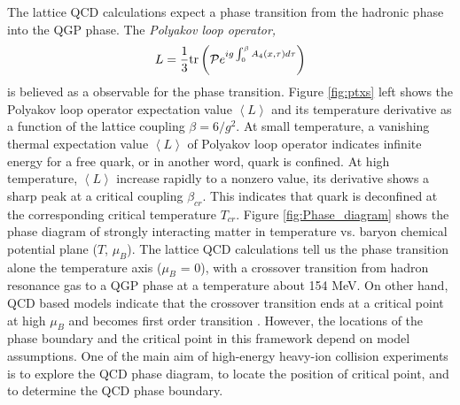 The lattice QCD calculations expect a phase transition from the hadronic
phase into the QGP phase. The\emph{ Polyakov loop operator,
\begin{equation}
L=\frac{1}{3}{\rm tr}\left(\mathcal{P}e^{ig\intop_{0}^{\beta}A_{4}(x,\tau)d\tau}\right)
\end{equation}
}is believed as a observable for the phase transition. Figure \ref{fig:ptxs}
left shows the Polyakov loop operator expectation value $\left\langle L\right\rangle $
and its temperature derivative as a function of the lattice coupling
$\beta=6/g^{2}$. At small temperature, a vanishing thermal expectation
value $\left\langle L\right\rangle $ of Polyakov loop operator indicates
infinite energy for a free quark, or in another word, quark is confined.
At high temperature, $\left\langle L\right\rangle $ increase rapidly
to a nonzero value, its derivative shows a sharp peak at a critical
coupling $\beta_{cr}$. This indicates that quark is deconfined at
the corresponding critical temperature $T_{cr}$. Figure \ref{fig:Phase_diagram}
shows the phase diagram of strongly interacting matter in temperature
vs. baryon chemical potential plane ($T$, $\mu_{B}$). The lattice
QCD calculations tell us the phase transition alone the temperature
axis ($\mu_{B}$ = 0), with a crossover transition from hadron resonance
gas to a QGP phase at a temperature about 154 MeV. On other hand,
QCD based models indicate that the crossover transition ends at a
critical point at high $\mu_{B}$ and becomes first order transition
\cite{PhysRevD.78.074507,PhysRevC.79.015202}. However, the locations
of the phase boundary and the critical point in this framework depend
on model assumptions. One of the main aim of high-energy heavy-ion
collision experiments is to explore the QCD phase diagram, to locate
the position of critical point, and to determine the QCD phase boundary.

